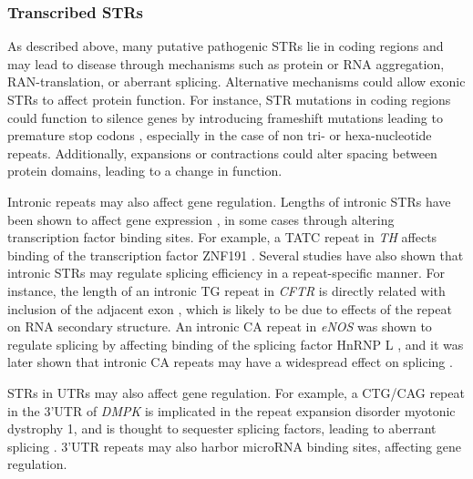 \subsubsection{Transcribed STRs}
As described above, many putative pathogenic STRs lie in coding regions and may lead to disease through mechanisms such as protein or RNA aggregation, RAN-translation, or aberrant splicing. Alternative mechanisms could allow exonic STRs to affect protein function. For instance, STR mutations in coding regions could function to silence genes by introducing frameshift mutations leading to premature stop codons \cite{GemayelVincesLegendreEtAl2010}, especially in the case of non tri- or hexa-nucleotide repeats. Additionally, expansions or contractions could alter spacing between protein domains, leading to a change in function.

Intronic repeats may also affect gene regulation. Lengths of intronic STRs have been shown to affect gene expression \cite{GebhardtZankerBrandt1999}, in some cases through altering transcription factor binding sites. For example, a TATC repeat in \emph{TH} affects binding of the transcription factor ZNF191 \cite{AlbaneseBiguetKieferEtAl2001}. Several studies have also shown that intronic STRs may regulate splicing efficiency in a repeat-specific manner. For instance, the length of an intronic TG repeat in \emph{CFTR} is directly related with inclusion of the adjacent exon \cite{HefferonGromanYurkEtAl2004}, which is likely to be due to effects of the repeat on RNA secondary structure. An intronic CA repeat in \emph{eNOS} was shown to regulate splicing by affecting binding of the splicing factor HnRNP L \cite{HuiStanglLaneEtAl2003}, and it was later shown that intronic CA repeats may have a widespread effect on splicing \cite{HuiHungHeinerEtAl2005}.

STRs in UTRs may also affect gene regulation. For example, a CTG/CAG repeat in the 3'UTR of \emph{DMPK} is implicated in the repeat expansion disorder myotonic dystrophy 1, and is thought to sequester splicing factors, leading to aberrant splicing \cite{KoscianskaWitkosKozlowskaEtAl2015}. 3'UTR repeats may also harbor microRNA binding sites, affecting gene regulation.

